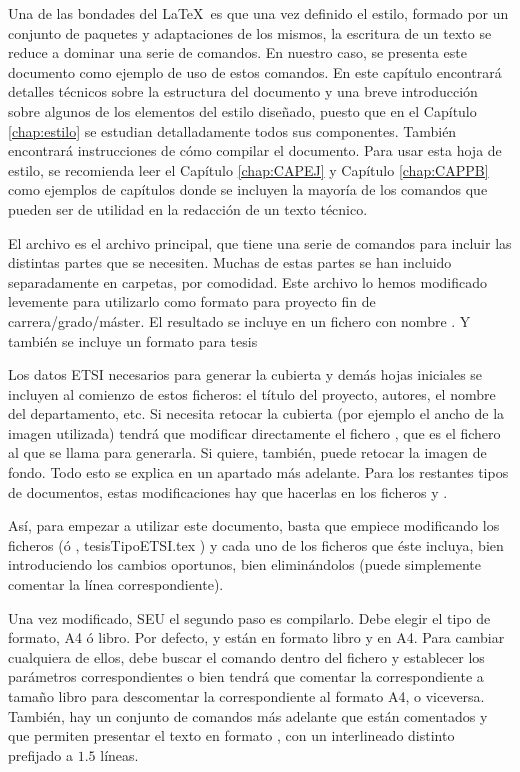 Una de las bondades del \LaTeX\ es que una vez definido el estilo, formado por un conjunto de paquetes y adaptaciones de los mismos, la escritura de un texto se reduce a dominar una serie de comandos. En nuestro caso, se presenta este documento como ejemplo de uso de estos comandos. En este capítulo encontrará detalles técnicos sobre la estructura del documento y una breve introducción sobre algunos de los elementos del estilo diseñado, puesto que en el Capítulo \ref{chap:estilo} se estudian detalladamente todos sus componentes. También encontrará instrucciones de cómo compilar el documento. Para usar esta hoja de estilo, se recomienda leer el Capítulo \ref{chap:CAPEJ} y Capítulo \ref{chap:CAPPB} como ejemplos de capítulos donde se incluyen la mayoría de los comandos que pueden ser de utilidad en la redacción de un texto técnico. 

El archivo  es el archivo principal, que tiene una serie de comandos para incluir las distintas partes que se necesiten. Muchas de estas partes se han incluido separadamente en carpetas, por comodidad. Este archivo lo hemos modificado levemente para utilizarlo como formato para proyecto fin de carrera/grado/máster. El resultado se incluye en un fichero con nombre . Y también se incluye un formato para tesis 

Los datos \gls{ETSI} necesarios para generar la cubierta y demás hojas iniciales se incluyen al comienzo de estos ficheros: el título del proyecto, autores, el nombre del departamento, etc. Si necesita retocar la cubierta  (por ejemplo el ancho de la imagen utilizada)  tendrá que modificar directamente el fichero , que es el fichero al que se llama para generarla. Si quiere, también, puede retocar la imagen de fondo. Todo esto se explica en un apartado más adelante. Para los restantes tipos de documentos, estas modificaciones hay que hacerlas en los ficheros  y .

Así, para empezar a utilizar este documento, basta que empiece modificando los ficheros  (ó , {tesisTipoETSI.tex} ) y cada uno de los ficheros que éste incluya, bien introduciendo los cambios oportunos, bien eliminándolos (puede simplemente comentar la línea correspondiente).

Una vez modificado, \gls{SEU}  el segundo paso es compilarlo. Debe elegir el tipo de formato, A4 ó libro. Por defecto,  y   están en formato libro y  en A4. Para cambiar cualquiera de ellos, debe buscar el comando  dentro del fichero   y establecer los parámetros correspondientes o bien tendrá que comentar la correspondiente a tamaño libro para descomentar la correspondiente al formato A4, o viceversa. También, hay un conjunto de comandos más adelante que están comentados y que permiten presentar el texto en formato , con un interlineado distinto prefijado a $1.5$ líneas. 

